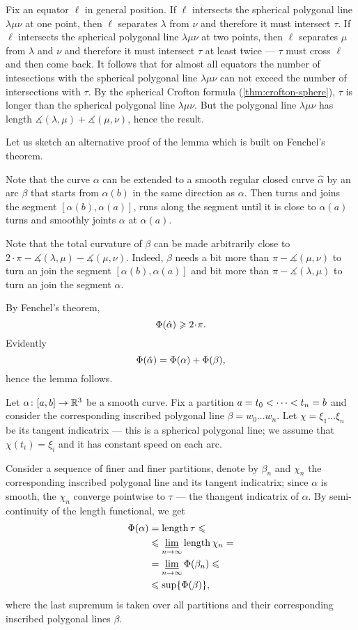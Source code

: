 Fix an equator $\ell$ in general position.
If $\ell$ intersects the spherical polygonal line $\lambda \mu \nu$ at one point, then $\ell$ separates $\lambda$ from $\nu$ and therefore it must intersect $\tau$.
If $\ell$ intersects the spherical polygonal line $\lambda \mu \nu$ at two points, then $\ell$ separates $\mu$ from $\lambda$ and $\nu$ and therefore it must intersect $\tau$ at least twice --- $\tau$ must cross $\ell$ and then come back.
It follows that for almost all equators the number of intesections with the spherical polygonal line $\lambda \mu\nu$ can not exceed the number of intersections with $\tau$.
By the spherical Crofton formula (\ref{thm:crofton-sphere}), $\tau$ is longer than the spherical polygonal line $\lambda \mu\nu$.
But the polygonal line $\lambda \mu\nu$ has length $\measuredangle (\lambda,\mu)+\measuredangle (\mu,\nu)$, hence the result.
\qeds

Let us sketch an alternative proof of the lemma which is built on Fenchel's theorem. 

Note that the curve $\alpha$ can be extended to a smooth regular closed curve $\hat\alpha$ by an arc $\beta$ that starts from $\alpha(b)$ in the same direction as $\alpha$. Then turns and joins the segment $[\alpha(b),\alpha(a)]$, runs along the segment until it is close to $\alpha(a)$ turns and smoothly joints $\alpha$ at $\alpha(a)$.

Note that the total curvature of $\beta$ can be made arbitrarily close to $2\cdot\pi -\measuredangle (\lambda,\mu)-\measuredangle (\mu,\nu)$.
Indeed, $\beta$ needs a bit more than $\pi -\measuredangle (\mu,\nu)$ to turn an join the segment $[\alpha(b),\alpha(a)]$ and bit more than $\pi -\measuredangle (\lambda,\mu)$ to turn an join the segment $\alpha$.

By Fenchel's theorem,
\[\tc{\hat\alpha}\ge 2\cdot \pi.\]
Evidently 
\[\Phi({\hat\alpha})=\Phi({\alpha})+\Phi({\beta}),\]
hence the lemma follows.
\qeds


Let $\alpha\colon[a,b]\to\mathbb{R}^3$ be a smooth curve.
Fix a partition $a\z=t_0<\dots<t_n=b$ and consider the corresponding inscribed polygonal line $\beta=w_0\dots w_n$.
Let $\chi=\xi_1\dots\xi_n$ be its tangent indicatrix --- this is a spherical polygonal line;
we assume that $\chi(t_i)=\xi_i$ and it has constant speed on each arc.

Consider a sequence of finer and finer partitions, denote by $\beta_n$ and $\chi_n$ the corresponding inscribed polygonal line and its tangent indicatrix;
since $\alpha$ is smooth, the $\chi_n$ converge pointwise to $\tau$ --- the thangent indicatrix of $\alpha$.
By semi-continuity of the length functional, we get  
\begin{align*}
\Phi({\alpha})&=\mathop{\rm length}\nolimits \tau\leqslant  
\\
&\leqslant \varliminf_{n\to\infty}\mathop{\rm length}\nolimits \chi_n=
\\
&= \varliminf_{n\to\infty}\Phi({\beta_n})\leqslant
\\
&\leqslant \sup\{\Phi({\beta})\},
\end{align*}
where the last supremum is taken over all partitions and their corresponding inscribed polygonal lines $\beta$.

